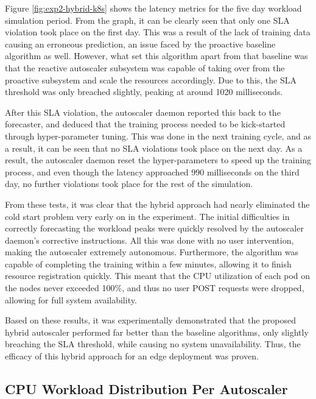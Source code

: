 Figure \ref{fig:exp2-hybrid-k8s} shows the latency metrics for the five day workload simulation period. From the graph, it can be clearly seen that only one SLA violation took place on the first day. This was a result of the lack of training data causing an erroneous prediction, an issue faced by the proactive baseline algorithm as well. However, what set this algorithm apart from that baseline was that the reactive autoscaler subsystem was capable of taking over from the proactive subsystem and scale the resources accordingly. Due to this, the SLA threshold was only breached slightly, peaking at around 1020 milliseconds.\par
After this SLA violation, the autoscaler daemon reported this back to the forecaster, and deduced that the training process needed to be kick-started through hyper-parameter tuning. This was done in the next training cycle, and as a result, it can be seen that no SLA violations took place on the next day. As a result, the autoscaler daemon reset the hyper-parameters to speed up the training process, and even though the latency approached 990 milliseconds on the third day, no further violations took place for the rest of the simulation.\par

From these tests, it was clear that the hybrid approach had nearly eliminated the cold start problem very early on in the experiment. The initial difficulties in correctly forecasting the workload peaks were quickly resolved by the autoscaler daemon's corrective instructions. All this was done with no user intervention, making the autoscaler extremely autonomous. Furthermore, the algorithm was capable of completing the training within a few minutes, allowing it to finish resource registration quickly. This meant that the CPU utilization of each pod on the nodes never exceeded 100\%, and thus no user POST requests were dropped, allowing for full system availability.\par

Based on these results, it was experimentally demonstrated that the proposed hybrid autoscaler performed far better than the baseline algorithms, only slightly breaching the SLA threshold, while causing no system unavailability. Thus, the efficacy of this hybrid approach for an edge deployment was proven.

\subsection {CPU Workload Distribution Per Autoscaler}
\label{subsec:ch5-exp2-workload-dist}

